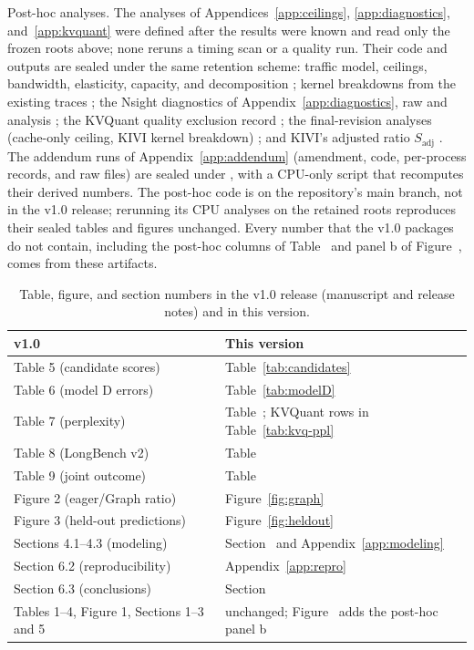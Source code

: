 Post-hoc analyses.
The analyses of Appendices~\ref{app:ceilings}, \ref{app:diagnostics}, and~\ref{app:kvquant} were defined after the results were known and read only the frozen roots above; none reruns a timing scan or a quality run.
Their code and outputs are sealed under the same retention scheme: traffic model, ceilings, bandwidth, elasticity, capacity, and decomposition ; kernel breakdowns from the existing traces ; the Nsight diagnostics of Appendix~\ref{app:diagnostics}, raw  and analysis ; the KVQuant quality exclusion record ; the final-revision analyses (cache-only ceiling, KIVI kernel breakdown) ; and KIVI's adjusted ratio $S_{\mathrm{adj}}$ .
The addendum runs of Appendix~\ref{app:addendum} (amendment, code, per-process records, and raw files) are sealed under , with a CPU-only script that recomputes their derived numbers.
The post-hoc code is on the repository's main branch, not in the v1.0 release; rerunning its CPU analyses on the retained roots reproduces their sealed tables and figures unchanged.
Every number that the v1.0 packages do not contain, including the post-hoc columns of Table~ and panel b of Figure~, comes from these artifacts.

\begin{table}[t]
\caption{Table, figure, and section numbers in the v1.0 release (manuscript and release notes) and in this version.}
\label{tab:numbering}
\vskip 0.1in
\centering
\footnotesize
\setlength{\tabcolsep}{3pt}
\begin{tabular}{@{}L{3.7cm}L{4.0cm}@{}}
\toprule
v1.0 & This version \\
\midrule
Table 5 (candidate scores) & Table~\ref{tab:candidates} \\
Table 6 (model D errors) & Table~\ref{tab:modelD} \\
Table 7 (perplexity) & Table~; KVQuant rows in Table~\ref{tab:kvq-ppl} \\
Table 8 (LongBench v2) & Table~ \\
Table 9 (joint outcome) & Table~ \\
Figure 2 (eager/Graph ratio) & Figure~\ref{fig:graph} \\
Figure 3 (held-out predictions) & Figure~\ref{fig:heldout} \\
Sections 4.1--4.3 (modeling) & Section~ and Appendix~\ref{app:modeling} \\
Section 6.2 (reproducibility) & Appendix~\ref{app:repro} \\
Section 6.3 (conclusions) & Section~ \\
Tables 1--4, Figure 1, Sections 1--3 and 5 & unchanged; Figure~ adds the post-hoc panel b \\
\bottomrule
\end{tabular}
\end{table}


